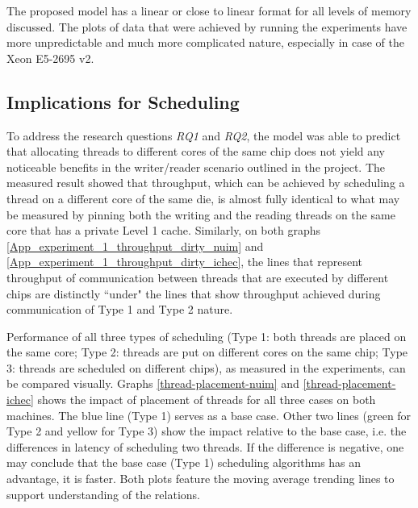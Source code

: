 The proposed model has a linear or close to linear format for all levels of memory discussed. The plots of data that were achieved by running the experiments have more unpredictable and much more complicated nature, especially in case of the Xeon E5-2695 v2.

\subsection{Implications for Scheduling}

To address the research questions \textit{RQ1} and \textit{RQ2}, the model was able to predict that allocating threads to different cores of the same chip does not yield any noticeable benefits in the writer/reader scenario outlined in the project. The measured result showed that throughput, which can be achieved by scheduling a thread on a different core of the same die, is almost fully identical to what may be measured by pinning both the writing and the reading threads on the same core that has a private Level 1 cache. Similarly, on both graphs \ref{App_experiment_1_throughput_dirty_nuim} and \ref{App_experiment_1_throughput_dirty_ichec}, the lines that represent throughput of communication between threads that are executed by different chips are distinctly ``under" the lines that show throughput achieved during communication of Type 1 and Type 2 nature.

Performance of all three types of scheduling (Type 1: both threads are placed on the same core; Type 2: threads are put on different cores on the same chip; Type 3: threads are scheduled on different chips), as measured in the experiments, can be compared visually. Graphs \ref{thread-placement-nuim} and \ref{thread-placement-ichec} shows the impact of placement of threads for all three cases on both machines. The blue line (Type 1) serves as a base case. Other two lines (green for Type 2 and yellow for Type 3) show the impact relative to the base case, i.e. the differences in latency of scheduling two threads. If the difference is negative, one may conclude that the base case (Type 1) scheduling algorithms has an advantage, it is faster. Both plots feature the moving average trending lines to support understanding of the relations.

